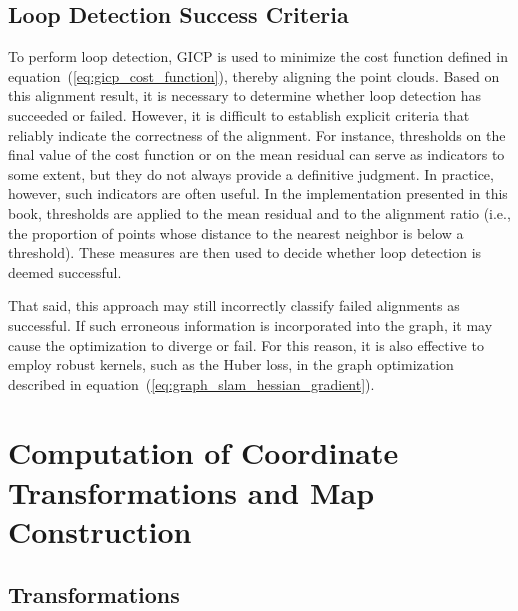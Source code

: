 \subsection{Loop Detection Success Criteria}

To perform loop detection, GICP is used to minimize the cost function defined in equation~(\ref{eq:gicp_cost_function}), thereby aligning the point clouds.
Based on this alignment result, it is necessary to determine whether loop detection has succeeded or failed.
However, it is difficult to establish explicit criteria that reliably indicate the correctness of the alignment.
For instance, thresholds on the final value of the cost function or on the mean residual can serve as indicators to some extent, but they do not always provide a definitive judgment.
In practice, however, such indicators are often useful.
In the implementation presented in this book, thresholds are applied to the mean residual and to the alignment ratio (i.e., the proportion of points whose distance to the nearest neighbor is below a threshold).
These measures are then used to decide whether loop detection is deemed successful.

That said, this approach may still incorrectly classify failed alignments as successful.
If such erroneous information is incorporated into the graph, it may cause the optimization to diverge or fail.
For this reason, it is also effective to employ robust kernels, such as the Huber loss, in the graph optimization described in equation~(\ref{eq:graph_slam_hessian_gradient}).











\section{Computation of Coordinate Transformations and Map Construction}

\subsection{Transformations}

